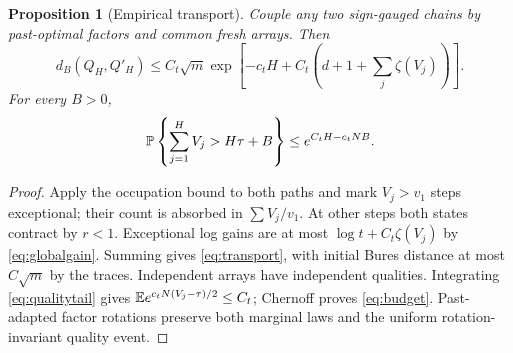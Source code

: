 \documentclass[11pt]{article}
\newtheorem{proposition}[theorem]{Proposition}
\begin{document}
\begin{proposition}[Empirical transport]\label{prop:transport}
Couple any two sign-gauged chains by past-optimal factors and common fresh arrays. Then
\begin{equation}\label{eq:transport}
 d_B(Q_H,Q'_H)\le C_t\sqrt m\exp\!\left[-c_tH+C_t\left(d+1+\sum_j\zeta(V_j)\right)\right].
\end{equation}
For every $B>0$,
\begin{equation}\label{eq:budget}
 \mathbb P\left\{\sum_{j=1}^HV_j>H\tau+B\right\}\le e^{C_tH-c_tNB}.
\end{equation}
\end{proposition}
\begin{proof}
Apply the occupation bound to both paths and mark $V_j>v_1$ steps exceptional; their count is absorbed in $\sum V_j/v_1$. At other steps both states contract by $r<1$. Exceptional log gains are at most $\log t+C_t\zeta(V_j)$ by \eqref{eq:globalgain}. Summing gives \eqref{eq:transport}, with initial Bures distance at most $C\sqrt m$ by the traces. Independent arrays have independent qualities. Integrating \eqref{eq:qualitytail} gives $\mathbb E e^{c_tN(V_j-\tau)/2}\le C_t$; Chernoff proves \eqref{eq:budget}. Past-adapted factor rotations preserve both marginal laws and the uniform rotation-invariant quality event.
\end{proof}
\end{document}
